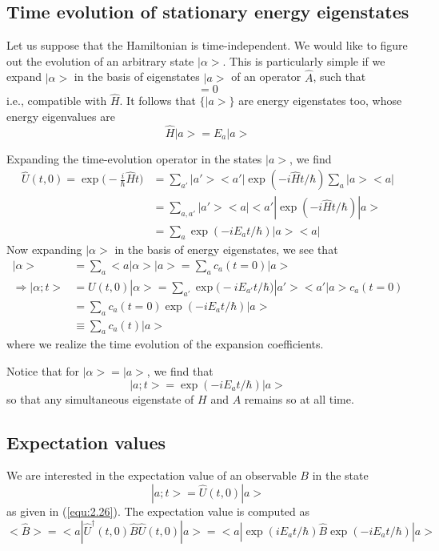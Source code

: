 \subsection{Time evolution of stationary energy eigenstates}
Let us suppose that the Hamiltonian is time-independent. We
would like to figure out the evolution of an arbitrary state
$|\alpha>$. This is particularly simple if we expand
$|\alpha>$ in the basis of eigenstates $|a>$ of an operator
$\hat{A}$, such that
\begin{equation}
  [\hat{A}, \hat{H}] = 0
  \label{equ:2.21}
\end{equation}
i.e., compatible with $\hat{H}$. It follows that $\{|a>\}$
are energy eigenstates too, whose energy eigenvalues are
\begin{equation}
  \hat{H} |a> = E_a |a>
  \label{equ:2.22}
\end{equation}

Expanding the time-evolution operator in the states $|a>$,
we find
\begin{align}
  \hat{U}(t, 0) = \exp\Big(-\frac{i}{\hbar} \hat{H}t\Big) &= 
  \sum_{a'} |a'><a'| \exp(-i \hat{H} t / \hbar) \sum_a
  |a><a|\nonumber\\
  &=
  \sum_{a,a'} |a'><a| <a'|\exp(-i\hat{H}t/\hbar)
  |a>\nonumber\\
  &=
  \sum_a \exp(-i E_a t /\hbar) |a><a|
  \label{equ:2.23}
\end{align}
Now expanding $|\alpha>$ in the basis of energy eigenstates,
we see that
\begin{align*}
|\alpha> &= \sum_a <a|\alpha> |a> = \sum_a c_a(t=0) |a>
  \nonumber\\
  \Rightarrow |\alpha;t> &= U(t,0) |\alpha> = \sum_{a'}
  \exp\Big(-i E_{a'}t/\hbar\Big) |a'><a'|a> c_a(t=0)
  \nonumber\\
  &=
  \sum_a c_a(t= 0) \exp(-iE_a t/\hbar) |a>\\
  &\equiv \sum_a c_a(t) |a> \label{equ:2.24}
\end{align*}
where we realize the time evolution of the expansion
coefficients.

Notice that for $|\alpha> = |a>$, we find that
\begin{equation}
  |a;t> = \exp(-i E_a t/\hbar) |a>
  \label{equ:2.25}
\end{equation}
so that any simultaneous eigenstate of $H$ and $A$ remains
so at all time.
\subsection{Expectation values}
We are interested in the expectation value of an observable
$B$ in the state
$$
  |a;t> = \hat{U}(t,0) |a>
$$
as given in (\ref{equ:2.26}). The expectation value is
computed as
$$
<\hat{B}> = <a|\hat{U}^{\dagger}(t,0) \hat{B} \hat{U}(t,0) |a>
= 
<a|\exp(iE_a t/\hbar) \hat{B} \exp(-i E_a t/\hbar) |a>
$$

